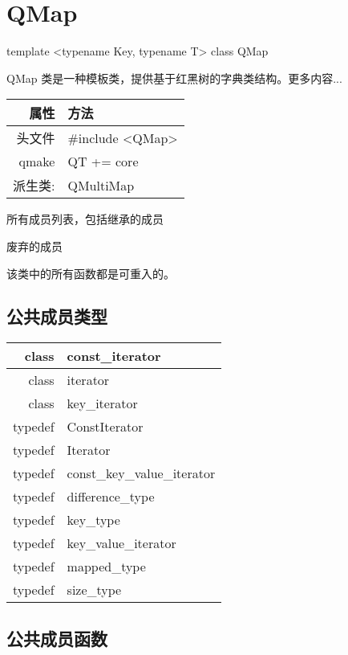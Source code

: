 \chapter{QMap}

template <typename Key, typename T> class QMap

QMap 类是一种模板类，提供基于红黑树的字典类结构。更多内容...


\begin{tabular}{|r|l|}
	\hline
	属性 & 方法 \\
	\hline
	头文件 & \#include <QMap>\\      
	\hline
	qmake & QT += core\\      
	\hline
	派生类:	& QMultiMap \\
	\hline
\end{tabular}

\begin{compactitem}
\item 所有成员列表，包括继承的成员
\item 废弃的成员
\end{compactitem}

\begin{notice}
该类中的所有函数都是可重入的。
\end{notice}

\section{公共成员类型}

\begin{longtable}{|r|l|}
\hline
class	& const\_iterator \\
\hline
class &	iterator \\ 
\hline
class &	key\_iterator \\ 
\hline
typedef	&ConstIterator \\ 
\hline
typedef	&Iterator \\ 
\hline
typedef	&const\_key\_value\_iterator \\
\hline
typedef	&difference\_type \\        
\hline
typedef	&key\_type \\
\hline
typedef & key\_value\_iterator \\
\hline
typedef	&mapped\_type \\ 
\hline
typedef	&size\_type \\ 
\hline
\end{longtable}

\section{公共成员函数}

